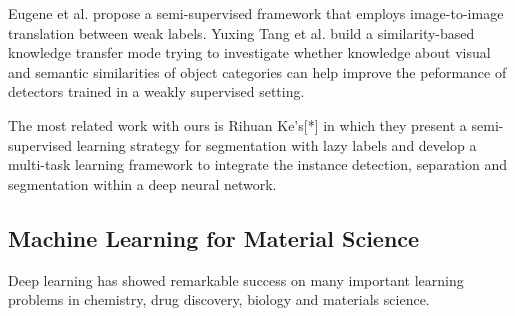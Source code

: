 \documentclass[10pt,twocolumn,letterpaper]{article}
\begin{document}


Eugene et al. propose a semi-supervised framework that employs image-to-image translation between weak labels.
Yuxing Tang et al. build a similarity-based knowledge transfer mode trying to investigate whether knowledge about visual and semantic similarities of object categories can help improve the peformance of detectors trained in a weakly supervised setting.

The most related work with ours is Rihuan Ke's[*] in which they present a semi-supervised learning strategy for segmentation with lazy labels and develop a multi-task learning framework to integrate the instance detection, separation and segmentation within a deep neural network.

\subsection{Machine Learning for Material Science}

Deep learning has showed remarkable success on many important 
learning problems in chemistry, drug discovery, biology and materials science.
\end{document}
